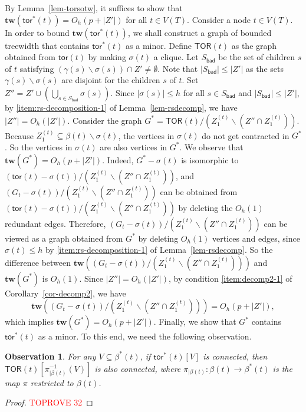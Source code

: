 \documentclass[a4paper,11pt]{article}
\numberwithin{lemma}{section}
\newtheorem{observation}[lemma]{Observation}
\newcommand{\tw}{\mathbf{tw}}
\newcommand{\tor}{\mathsf{tor}}
\begin{document}
By Lemma~\ref{lem-torsotw}, it suffices to show that $\tw(\tor^*(t)) = O_h(p+|Z'|)$ for all $t \in V(T)$.
Consider a node $t \in V(T)$.
In order to bound $\tw(\tor^*(t))$, we shall construct a graph of bounded treewidth that contains $\tor^*(t)$ as a minor.
Define $\mathsf{TOR}(t)$ as the graph obtained from $\tor(t)$ by making $\sigma(t)$ a clique.
Let $S_\mathsf{bad}$ be the set of children $s$ of $t$ satisfying $(\gamma(s) \backslash \sigma(s)) \cap Z' \neq \emptyset$.
Note that $|S_\mathsf{bad}| \leq |Z'|$ as the sets $\gamma(s) \backslash \sigma(s)$ are disjoint for the children $s$ of $t$.
Set $Z'' = Z' \cup (\bigcup_{s \in S_\mathsf{bad}} \sigma(s))$.
Since $|\sigma(s)| \leq h$ for all $s \in S_\mathsf{bad}$ and $|S_\mathsf{bad}| \leq |Z'|$, by \ref{item:rs-decomposition-1} of Lemma~\ref{lem-rsdecomp}, we have $|Z''| = O_h(|Z'|)$.
Consider the graph $G^* = \mathsf{TOR}(t)/(Z_1^{(t)} \backslash (Z'' \cap Z_1^{(t)}))$.
Because $Z_1^{(t)} \subseteq \beta(t) \backslash \sigma(t)$, the vertices in $\sigma(t)$ do not get contracted in $G^*$.
So the vertices in $\sigma(t)$ are also vertices in $G^*$.
We observe that $\tw(G^*) = O_h(p+|Z'|)$.
Indeed, $G^* - \sigma(t)$ is isomorphic to $(\tor(t)-\sigma(t))/(Z_1^{(t)} \backslash (Z'' \cap Z_1^{(t)}))$, and $(G_t - \sigma(t))/(Z_1^{(t)} \backslash (Z'' \cap Z_1^{(t)}))$ can be obtained from $(\tor(t)-\sigma(t))/(Z_1^{(t)} \backslash (Z'' \cap Z_1^{(t)}))$ by deleting the $O_h(1)$ redundant edges.
Therefore, $(G_t - \sigma(t))/(Z_1^{(t)} \backslash (Z'' \cap Z_1^{(t)}))$ can be viewed as a graph obtained from $G^*$ by deleting $O_h(1)$ vertices and edges, since $\sigma(t) \leq h$ by \ref{item:rs-decomposition-1} of Lemma~\ref{lem-rsdecomp}.
So the difference between $\tw((G_t - \sigma(t))/(Z_1^{(t)} \backslash (Z'' \cap Z_1^{(t)})))$ and $\tw(G^*)$ is $O_h(1)$.
Since $|Z''| = O_h(|Z'|)$, by condition \ref{item:decomp2-1} of Corollary~\ref{cor-decomp2}, we have
\begin{equation*}
    \tw((G_t - \sigma(t))/(Z_1^{(t)} \backslash (Z'' \cap Z_1^{(t)}))) = O_h(p+|Z'|),
\end{equation*}
which implies $\tw(G^*) = O_h(p+|Z'|)$.
Finally, we show that $G^*$ contains $\tor^*(t)$ as a minor.
To this end, we need the following observation.

\begin{observation} \label{obs-TORconnected}
For any $V \subseteq \beta^*(t)$, if $\tor^*(t)[V]$ is connected, then $\mathsf{TOR}(t)[\pi_{|\beta(t)}^{-1}(V)]$ is also connected, where $\pi_{|\beta(t)}: \beta(t) \rightarrow \beta^*(t)$ is the map $\pi$ restricted to $\beta(t)$.
\end{observation}
\begin{proof}\textcolor{red}{TOPROVE 32}\end{proof}
\end{document}
